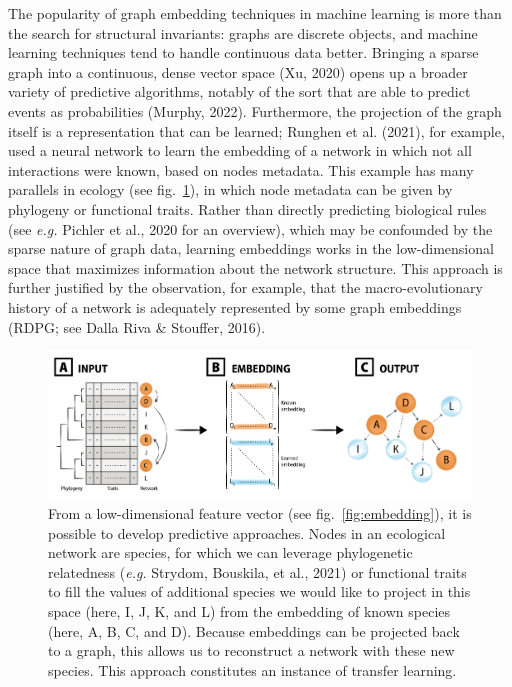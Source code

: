 \documentclass[11pt]{article}
\makeatletter
\def\maxwidth{\ifdim\Gin@nat@width>\linewidth\linewidth
\else\Gin@nat@width\fi}
\let\Oldincludegraphics\includegraphics
\renewcommand{\includegraphics}[1]{\Oldincludegraphics[width=\maxwidth]{#1}}
\makeatother
\begin{document}
The popularity of graph embedding techniques in machine learning is more
than the search for structural invariants: graphs are discrete objects,
and machine learning techniques tend to handle continuous data better.
Bringing a sparse graph into a continuous, dense vector space (Xu, 2020)
opens up a broader variety of predictive algorithms, notably of the sort
that are able to predict events as probabilities (Murphy, 2022).
Furthermore, the projection of the graph itself is a representation that
can be learned; Runghen et al. (2021), for example, used a neural
network to learn the embedding of a network in which not all
interactions were known, based on nodes metadata. This example has many
parallels in ecology (see fig.~\ref{fig:prediction}), in which node
metadata can be given by phylogeny or functional traits. Rather than
directly predicting biological rules (see \emph{e.g.} Pichler et al.,
2020 for an overview), which may be confounded by the sparse nature of
graph data, learning embeddings works in the low-dimensional space that
maximizes information about the network structure. This approach is
further justified by the observation, for example, that the
macro-evolutionary history of a network is adequately represented by
some graph embeddings (RDPG; see Dalla Riva \& Stouffer, 2016).

\begin{figure}
\hypertarget{fig:prediction}{%
\centering
\includegraphics{figures/conceptual_prediction.png}
\caption{From a low-dimensional feature vector (see
fig.~\ref{fig:embedding}), it is possible to develop predictive
approaches. Nodes in an ecological network are species, for which we can
leverage phylogenetic relatedness (\emph{e.g.} Strydom, Bouskila, et
al., 2021) or functional traits to fill the values of additional species
we would like to project in this space (here, I, J, K, and L) from the
embedding of known species (here, A, B, C, and D). Because embeddings
can be projected back to a graph, this allows us to reconstruct a
network with these new species. This approach constitutes an instance of
transfer learning.}\label{fig:prediction}
}
\end{figure}
\end{document}
